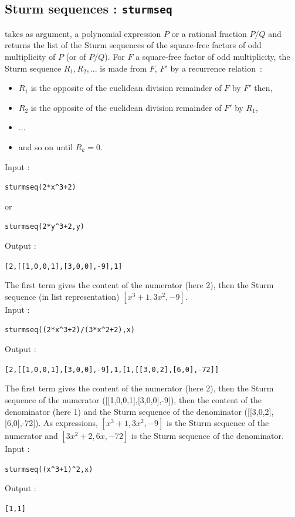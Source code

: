 \documentclass[a4paper,11pt]{book}
\begin{document}
\subsection{Sturm sequences : {\tt sturmseq}}
 takes as argument, a polynomial expression $P$ or a 
rational fraction $P/Q$ and returns the list of the Sturm sequences 
of the square-free factors of odd multiplicity of $P$ (or of $P/Q$).
For $F$ a square-free factor of odd multiplicity, the Sturm 
sequence $R_1,R_2,...$ is made from $F$, $F'$ by a recurrence
relation~:
\begin{itemize}
\item 
$R_1$ is the opposite of the euclidean division remainder of $F$ by
$F'$ then,
\item
$R_2$ is the opposite of the euclidean division remainder of  $F'$ by
$R_1$, 
\item ... 
\item and so on until $R_k=0$.
\end{itemize}
Input :
\begin{center}{\tt sturmseq(2*x\verb|^|3+2)}\end{center}
or 
\begin{center}{\tt sturmseq(2*y\verb|^|3+2,y)}\end{center}
Output :
\begin{center}{\tt [2,[[1,0,0,1],[3,0,0],-9],1]}\end{center}
The first term gives the content of the numerator (here 2), 
then the Sturm sequence (in list representation) $[x^3+1,3x^2,-9]$.\\
Input :
\begin{center}{\tt sturmseq((2*x\verb|^|3+2)/(3*x\verb|^|2+2),x)}\end{center}
Output :
\begin{center}{\tt [2,[[1,0,0,1],[3,0,0],-9],1,[1,[[3,0,2],[6,0],-72]]}\end{center}
The first term gives the content of the numerator (here 2), 
then the Sturm sequence of the numerator ([[1,0,0,1],[3,0,0],-9]), 
then the content of the denominator (here 1) and the Sturm 
sequence of the denominator ([[3,0,2],[6,0],-72]). As expressions,
$[x^3+1,3x^2, -9]$ is the Sturm sequence of the numerator and
$[3x^2+2,6x,-72]$ is the Sturm sequence of the denominator.\\
Input :
\begin{center}{\tt sturmseq((x\verb|^|3+1)\verb|^|2,x)}\end{center}
Output :
\begin{center}{\tt [1,1]}\end{center}
\end{document}
